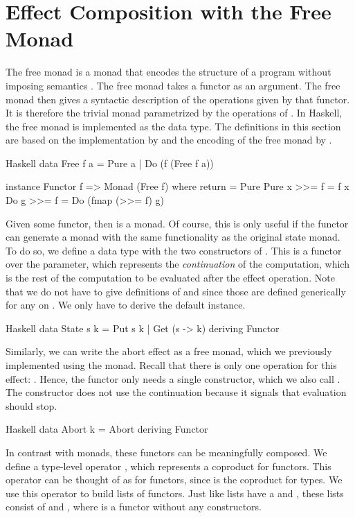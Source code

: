 \section{Effect Composition with the Free Monad}

The free monad is a monad that encodes the structure of a program without imposing semantics \autocite{swierstra_data_2008}. The free monad takes a functor  as an argument. The free monad then gives a syntactic description of the operations given by that functor. It is therefore the trivial monad parametrized by the operations of . In Haskell, the free monad is implemented as the  data type. The definitions in this section are based on the implementation by \textcite{kammar_handlers_2013} and the encoding of the free monad by \textcite{bach_poulsen_hefty_2023}.

\begin{lst}{Haskell}
data Free f a
  = Pure a
  | Do (f (Free f a))

instance Functor f => Monad (Free f) where
  return = Pure
  Pure x >>= f = f x
  Do g >>= f = Do (fmap (>>= f) g)
\end{lst}
%
Given some  functor, then  is a monad. Of course, this is only useful if the  functor can generate a monad with the same functionality as the original state monad. To do so, we define a data type with the two constructors of . This is a functor over the  parameter, which represents the \emph{continuation} of the computation, which is the rest of the computation to be evaluated after the effect operation. Note that we do not have to give definitions of  and \hs{>>=} since those are defined generically for any  on . We only have to derive the default  instance.

\begin{lst}{Haskell}
data State s k = Put s k | Get (s -> k)
  deriving Functor
\end{lst}
%
Similarly, we can write the abort effect as a free monad, which we previously implemented using the  monad. Recall that there is only one operation for this effect: . Hence, the  functor only needs a single constructor, which we also call . The  constructor does not use the continuation because it signals that evaluation should stop.

\begin{lst}{Haskell}
data Abort k = Abort
  deriving Functor
\end{lst}
%
In contrast with monads, these functors can be meaningfully composed. We define a type-level operator \hs{+}, which represents a coproduct for functors. This operator can be thought of as  for functors, since  is the coproduct for types. We use this operator to build lists of functors. Just like lists have a  and , these lists consist of \hs{+} and , where  is a functor without any constructors.

